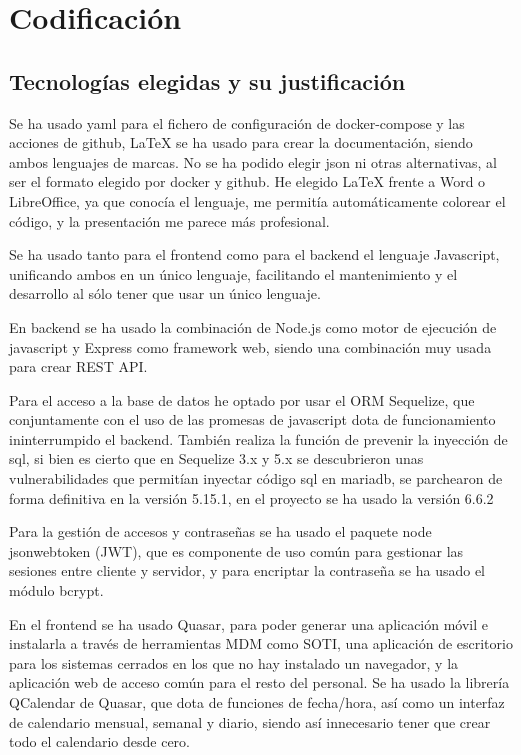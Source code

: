 \documentclass[11pt,spanish,listoffigures,listoftables]{tfgetsinf}
\begin{document}
\chapter{Codificación}

\section{Tecnologías elegidas y su justificación}

Se ha usado yaml para el fichero de configuración de docker-compose y las acciones de github, \LaTeX{} se ha usado para crear la documentación, siendo ambos lenguajes de marcas. 
No se ha podido elegir json ni otras alternativas, al ser el formato elegido por docker y github. He elegido \LaTeX{} frente a Word o LibreOffice, ya que conocía el lenguaje, me permitía automáticamente colorear el código, y la presentación me parece más profesional.

Se ha usado tanto para el frontend como para el backend el lenguaje Javascript, unificando ambos en un único lenguaje, facilitando el mantenimiento y el desarrollo al sólo tener que usar un único lenguaje.

En backend se ha usado la combinación de Node.js como motor de ejecución de javascript y Express como framework web, siendo una combinación muy usada para crear REST API.

Para el acceso a la base de datos he optado por usar el ORM Sequelize, que conjuntamente con el uso de las promesas de javascript dota de funcionamiento ininterrumpido el backend. 
También realiza la función de prevenir la inyección de sql, si bien es cierto que en Sequelize 3.x y 5.x se descubrieron unas vulnerabilidades que permitían inyectar código sql en mariadb, se parchearon de forma definitiva en la versión 5.15.1, en el proyecto se ha usado la versión 6.6.2

Para la gestión de accesos y contraseñas se ha usado el paquete node jsonwebtoken (JWT), que es componente de uso común para gestionar las sesiones entre cliente y servidor, y para encriptar la contraseña se ha usado el módulo bcrypt.

En el frontend se ha usado Quasar, para poder generar una aplicación móvil e instalarla a través de herramientas MDM como SOTI, una aplicación de escritorio para los sistemas cerrados en los que no hay instalado un navegador, y la aplicación web de acceso común para el resto del personal.
Se ha usado la librería QCalendar de Quasar, que dota de funciones de fecha/hora, así como un interfaz de calendario mensual, semanal y diario, siendo así innecesario tener que crear todo el calendario desde cero.
\end{document}
